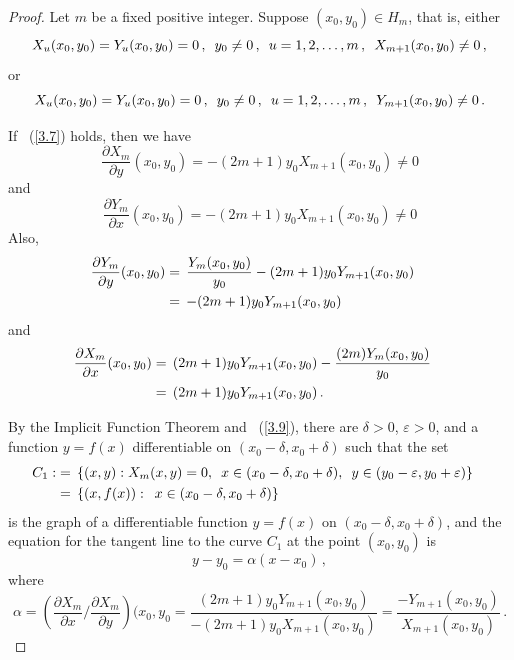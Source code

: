 \documentclass{article}
\theoremstyle{remark}
\numberwithin{equation}{section}
\begin{document}
\begin{proof}
Let $m$ be a fixed positive integer. Suppose $(x_0,y_0) \in H_m$, that is,
either
\begin{equation}\label{3.7} X_u(x_0,y_0) = Y_u(x_0,y_0) = 0\,, \enskip y_0 \neq 0\,, \enskip u=1,2,\ldots,m\,, \enskip X_{m+1}(x_0,y_0) \neq 0\,,
\end{equation}
or
\begin{equation}\label{3.8} X_u(x_0,y_0) = Y_u(x_0,y_0) = 0\,, \enskip y_0 \neq 0\,, \enskip u=1,2,\ldots,m\,, \enskip Y_{m+1}(x_0,y_0) \neq 0\,.
\end{equation}

If ~(\ref{3.7}) holds, then we have
\begin{equation}\label{3.9} \frac{\partial{X_m}}{\partial y}(x_0,y_0) = -(2m+1)y_0X_{m+1}(x_0,y_0) \neq 0
\end{equation}
and
\begin{equation}\label{3.10} \frac{\partial{Y_m}}{\partial x}(x_0,y_0) = -(2m+1)y_0X_{m+1}(x_0,y_0) \neq 0
\end{equation}  
Also,
\begin{equation}\label{3.11} \begin{split} \frac{\partial{Y_m}}{\partial y}(x_0,y_0) & = \, \frac{Y_m(x_0,y_0)}{y_0} - (2m+1)y_0Y_{m+1}(x_0,y_0) \cr
& = \, -(2m+1)y_0Y_{m+1}(x_0,y_0) \cr \end{split}
\end{equation}
and
\begin{equation}\label{3.12} \begin{split} \frac{\partial{X_m}}{\partial x}(x_0,y_0) & = \, (2m+1)y_0Y_{m+1}(x_0,y_0) - \frac{(2m)Y_m(x_0,y_0)}{y_0} \cr
& = \, (2m+1)y_0Y_{m+1}(x_0,y_0)\,. \end{split}
\end{equation}

By the Implicit Function Theorem and ~(\ref{3.9}), there are $\delta > 0$, $\varepsilon > 0$, and a function $y = f(x)$ differentiable on
$(x_0-\delta,x_0+\delta)$ such that the set
\begin{equation} \notag \begin{split} C_1 : & = \, \{(x,y): X_m(x,y) = 0, \enskip x \in (x_0-\delta,x_0+\delta), \enskip y \in (y_0-\varepsilon,y_0+\varepsilon)\} \cr
& = \, \{(x,f(x)): \enskip x \in (x_0-\delta,x_0+\delta)\}\cr \end{split}
\end{equation}
is the graph of a differentiable function $y = f(x)$ on $(x_0-\delta,x_0+\delta)$, and the equation for the tangent line to the curve $C_1$ at the point $(x_0,y_0)$ is
$$y-y_0 = \alpha(x-x_0)\,,$$
where
$$ \alpha = \left( \frac{\partial{X_m}}{\partial x} \Big / \frac{\partial{X_m}}{{\partial y}} \right)(x_0,y_0
= \frac{(2m+1)y_0Y_{m+1}(x_0,y_0)}{-(2m+1)y_0X_{m+1}(x_0,y_0)} = \frac{-Y_{m+1}(x_0,y_0)}{X_{m+1}(x_0,y_0)}\,.$$


\end{proof}
\end{document}
